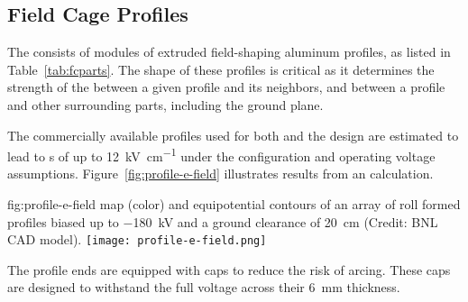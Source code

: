 
\subsection{Field Cage Profiles}
\label{sec:fdsp-hv-des-fc-profiles}

The  consists of modules of extruded field-shaping aluminum %
profiles, as listed in Table~\ref{tab:fcparts}. The shape of these %
profiles is critical as it determines the strength of the \efield{} between a given profile and its neighbors, and between a profile and 
other surrounding parts, including the ground plane.

The commercially available profiles used for both  and the  design are estimated to lead to \efield{}s of up to \SI{12}{\kilo\volt\per\centi\meter} under the 
configuration and operating voltage assumptions.
Figure~\ref{fig:profile-e-field} illustrates results from an \efield{} calculation.

\begin{dunefigure}
{fig:profile-e-field}
{\efield map (color) and equipotential contours of an array of roll formed profiles biased up to \SI{-180}{\kV} and a ground clearance of \SI{20}{\cm} (Credit: BNL CAD model).} \texttt{[image: profile-e-field.png]}
\end{dunefigure}

The profile ends are equipped with  caps to reduce the risk of arcing.  These caps are designed %
to withstand the full voltage across their \SI{6}{\milli\m} thickness. 


